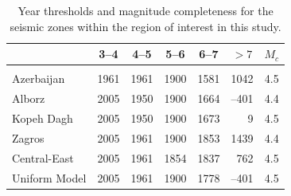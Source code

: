 \begin{table}%
    \centering
    \caption{Year thresholds and magnitude completeness for the seismic zones within the region of interest in this study.}
    \begin{tabular}{@{\hspace{0.2ex}}lccccrc@{\hspace{0.2ex}}}
        \cline{2-7}                                              \\[-1.6ex]
                        & 3--4 & 4--5 & 5--6 & 6--7 & 
                                  \multicolumn{1}{c}{$>7$} &$M_c$\\[0.6ex]
        \hline                                                   \\[-1.6ex]
        Azerbaijan      & 1961 & 1961 & 1900 & 1581 & 1042 & 4.5 \\
        Alborz          & 2005 & 1950 & 1900 & 1664 &--401 & 4.4 \\
        Kopeh Dagh      & 2005 & 1950 & 1900 & 1673 &    9 & 4.5 \\
        Zagros          & 2005 & 1961 & 1900 & 1853 & 1439 & 4.4 \\
        Central-East    & 2005 & 1961 & 1854 & 1837 &  762 & 4.5 \\
        Uniform Model   & 2005 & 1961 & 1900 & 1778 &--401 & 4.5 \\[0.5ex]
        \hline 
    \end{tabular}
    \label{tab:completeness} 
\end{table}





